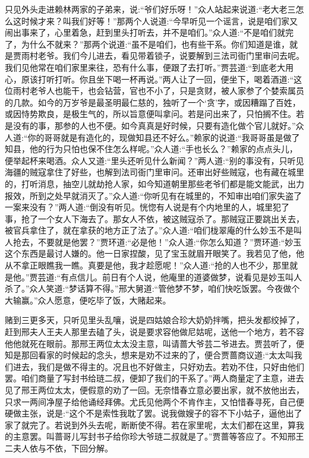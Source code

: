 \begin{parag}
    只见外头走进赖林两家的子弟来，说:“爷们好乐呀！”众人站起来说道:“老大老三怎么这时候才来？叫我们好等！”那两个人说道:“今早听见一个谣言，说是咱们家又闹出事来了，心里着急，赶到里头打听去，并不是咱们。”众人道:“不是咱们就完了，为什么不就来？”那两个说道:“虽不是咱们，也有些干系。你们知道是谁，就是贾雨村老爷。我们今儿进去，看见带着锁子，说要解到三法司衙门里审问去呢。我们见他常在咱们家里来往，恐有什么事，便跟了去打听。”贾芸道:“到底老大用心，原该打听打听。你且坐下喝一杯再说。”两人让了一回，便坐下，喝着酒道:“这位雨村老爷人也能干，也会钻营，官也不小了，只是贪财，被人家参了个婪索属员的几款。如今的万岁爷是最圣明最仁慈的，独听了一个‘贪’字，或因糟蹋了百姓，或因恃势欺良，是极生气的，所以旨意便叫拿问。若是问出来了，只怕搁不住。若是没有的事，那参的人也不便。如今真真是好时候，只要有造化做个官儿就好。”众人道:“你的哥哥就是有造化的，现做知县还不好么。”赖家的说道:“我哥哥虽是做了知县，他的行为只怕也保不住怎么样呢。”众人道:“手也长么？”赖家的点点头儿，便举起杯来喝酒。众人又道:“里头还听见什么新闻？”两人道:“别的事没有，只听见海疆的贼寇拿住了好些，也解到法司衙门里审问。还审出好些贼寇，也有藏在城里的，打听消息，抽空儿就劫抢人家，如今知道朝里那些老爷们都是能文能武，出力报效，所到之处早就消灭了。”众人道:“你听见有在城里的，不知审出咱们家失盗了一案来没有？”两人道:“倒没有听见。恍惚有人说是有个内地里的人，城里犯了事，抢了一个女人下海去了。那女人不依，被这贼寇杀了。那贼寇正要跳出关去，被官兵拿住了，就在拿获的地方正了法了。”众人道:“咱们栊翠庵的什么妙玉不是叫人抢去，不要就是他罢？”贾环道:“必是他！”众人道:“你怎么知道？”贾环道:“妙玉这个东西是最讨人嫌的。他一日家捏酸，见了宝玉就眉开眼笑了。我若见了他，他从不拿正眼瞧我一瞧。真要是他，我才趁愿呢！”众人道:“抢的人也不少，那里就是他。”贾芸道:“有点信儿。前日有个人说，他庵里的道婆做梦，说看见是妙玉叫人杀了。”众人笑道:“梦话算不得。”邢大舅道:“管他梦不梦，咱们快吃饭罢。今夜做个大输赢。”众人愿意，便吃毕了饭，大赌起来。
\end{parag}


\begin{parag}
    赌到三更多天，只听见里头乱嚷，说是四姑娘合珍大奶奶拌嘴，把头发都绞掉了，赶到邢夫人王夫人那里去磕了头，说是要求容他做尼姑呢，送他一个地方，若不容他他就死在眼前。那邢王两位太太没主意，叫请蔷大爷芸二爷进去。贾芸听了，便知是那回看家的时候起的念头，想来是劝不过来的了，便合贾蔷商议道:“太太叫我们进去，我们是做不得主的。况且也不好做主，只好劝去。若劝不住，只好由他们罢。咱们商量了写封书给琏二叔，便卸了我们的干系了。”两人商量定了主意，进去见了邢王两位太太，便假意的劝了一回。无奈惜春立意必要出家，就不放他出去，只求一两间净屋子给他诵经拜佛。尤氏见他两个不肯作主，又怕惜春寻死，自己便硬做主张，说是:“这个不是索性我耽了罢。说我做嫂子的容不下小姑子，逼他出了家了就完了。若说到外头去呢，断断使不得。若在家里呢，太太们都在这里，算我的主意罢。叫蔷哥儿写封书子给你珍大爷琏二叔就是了。”贾蔷等答应了。不知邢王二夫人依与不依，下回分解。
\end{parag}
